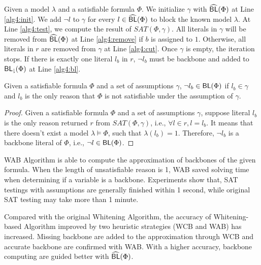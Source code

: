 Given a model $\lambda$ and a satisfiable formula $\Phi$. We initialize $\gamma$ with ${\sf \widehat{BL}}(\Phi)$ at Line \ref{alg4:init}. We add $\neg l$ to $\gamma$ for every $l\in{\sf \widehat{BL}}(\Phi)$ to block the known model $\lambda$. At Line \ref{alg4:test}, we compute the result of $SAT(\Phi,\gamma)$. All literals in $\gamma$ will be removed from ${\sf \widehat{BL}}(\Phi)$ at Line \ref{alg4:remove} if $b$ is assigned to $1$. Otherwise, all literals in $r$ are removed from $\gamma$ at Line \ref{alg4:cut}. Once $\gamma$ is empty, the iteration stops. If there is exactly one literal $l_b$ in $r$, $\neg l_b$ must be backbone and added to ${\sf {BL}_\downharpoonright}(\Phi)$ at Line \ref{alg4:bl}.

\begin{theorem}
Given a satisfiable formula $\Phi$ and a set of assumptions $\gamma$, $\neg l_b\in\textsf{BL}(\Phi)$ if $l_b\in\gamma$ and $l_b$ is the only reason that $\Phi$ is not satisfiable under the assumption of $\gamma$.
\end{theorem}

\begin{proof}
Given a satisfiable formula $\Phi$ and a set of assumptions $\gamma$, suppose literal $l_b$ is the only reason returned $r$ from $SAT(\Phi,\gamma)$, i.e., $\forall l\in r, l=l_b$.
It means that there doesn't exist a model $\lambda\models\Phi$, such that $\lambda(l_b)=1$. Therefore, $\neg l_b$ is a backbone literal of $\Phi$, i.e., $\neg l\in\textsf{BL}(\Phi)$.
\end{proof}

WAB Algorithm is able to compute the approximation of backbones of the given formula. When the length of unsatisfiable reason is 1, WAB saved solving time when determining if a variable is a backbone. Experiments show that, SAT testings with assumptions are generally finished within 1 second, while original SAT testing may take more than 1 minute.

Compared with the original Whitening Algorithm, the accuracy of Whitening-based Algorithm improved by two heuristic strategies (WCB and WAB) has increased. Missing backbone are added to the approximation through WCB and accurate backbone are confirmed with WAB. With a higher accuracy, backbone computing are guided better with ${\sf \widehat{BL}}(\Phi)$.
